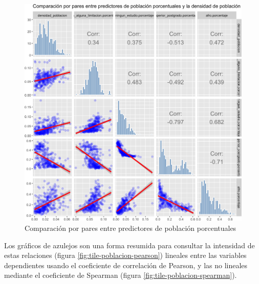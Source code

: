 \documentclass[12pt,a4paper,openany]{book}
\theoremstyle{definition}
\theoremstyle{definition}
\theoremstyle{definition}
\theoremstyle{remark}
\begin{document}
\begin{figure}

{\centering \includegraphics[width=1\linewidth]{tesis-unigis_files/figure-latex/bivar-poblacion-mod-1} 

}

\caption{Comparación por pares entre predictores de población porcentuales}\label{fig:bivar-poblacion-mod}
\end{figure}

Los gráficos de azulejos son una forma resumida para consultar la
intensidad de estas relaciones (figura \ref{fig:tile-poblacion-pearson})
lineales entre las variables dependientes usando el coeficiente de
correlación de Pearson, y las no lineales mediante el coeficiente de
Spearman (figura \ref{fig:tile-poblacion-spearman}).
\end{document}
